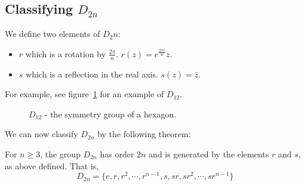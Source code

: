 \documentclass[../Main.tex]{subfiles}
\begin{document}
\subsection{Classifying \texorpdfstring{$D_{2n}$}{D2n}}
We define two elements of $D_2n$:
\begin{itemize}
    \item $r$ which is a rotation by $\frac{2\pi}{n}$. $r(z) = e^{\frac{2\pi i}{n}} z$.
    \item $s$ which is a reflection in the real axis. $s(z) = \bar{z}$.
\end{itemize}
For example, see figure~\ref{figD12} for an example of $D_{12}$.
\begin{figure}
    \centering
    \caption{$D_{12}$ - the symmetry group of a hexagon.}
    \label{figD12}
\end{figure}
We can now classify $D_{2n}$ by the following theorem:
\begin{theorem}
    For $n \geq 3$, the group $D_{2n}$ has order $2n$ and is generated by the elements $r$ and $s$, as above defined. That is,
    \begin{equation}
        D_{2n} = \{e, r, r^2, \cdots, r^{n-1}, s, sr, sr^2, \cdots, sr^{n-1}\}
        \label{eqnD2nElements}
    \end{equation}
    \label{thmD2n}
\end{theorem}
\end{document}
